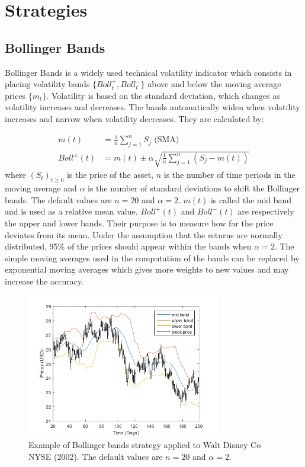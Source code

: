 \documentclass[11pt,a4,twosided,singlespacing,titlepagenumber=on]{scrreprt}
\numberwithin{equation}{chapter} %
\theoremstyle{remark}
\begin{document}
\section{Strategies}
\subsection{Bollinger Bands}
Bollinger Bands is a widely used technical volatility indicator which consists in placing volatility bands $\{Boll^+_t, Boll^-_t\}$ above and below the moving average prices $\{m_t\}$. Volatility is based on the standard deviation, which changes as volatility increases and decreases. The bands automatically widen when volatility increases and narrow when volatility decreases. They are calculated by:

\begin{align*}
m(t) &= \frac{1}{n}\sum_{j=1}^n S_j \text{ (SMA)} \\
Boll^\pm(t) &= m(t) \pm \alpha \sqrt{\frac{1}{n} \sum_{j=1}^n \left(S_j - m(t) \right)}
\end{align*}
where $(S_t)_{t \geq 0}$ is the price of the asset, $n$ is the number of time periods in the moving average and $\alpha$ is the number of standard deviations to shift the Bollinger bands. The default values are $n = 20$ and $\alpha = 2$. $m(t)$ is called the mid band and is used as a relative mean value. $Boll^+(t)$ and $Boll^-(t)$ are respectively the upper and lower bands. Their purpose is to measure how far the price deviates from its mean. Under the assumption that the returns are normally distributed, 95\% of the prices should appear within the bands when $\alpha = 2$. The simple moving averages used in the computation of the bands can be replaced by exponential moving averages which gives more weights to new values and may increase the accuracy.

\begin{figure}[htb]
\centering
\includegraphics[width = 0.75\textwidth]{bollinger_bands_intro}
\caption{Example of Bollinger bands strategy applied to Walt Disney Co NYSE (2002). The default values are $n = 20$ and $\alpha = 2$.}
\label{bollinger_bands_intro}
\end{figure}
\end{document}
